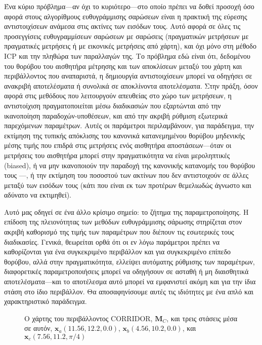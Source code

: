 Ένα κύριο πρόβλημα---αν όχι το κυριότερο---στο οποίο πρέπει να δοθεί προσοχή
όσο αφορά στους αλγορίθμους ευθυγράμμισης σαρώσεων είναι η πρακτική της εύρεσης
αντιστοιχίσεων ανάμεσα στις ακτίνες των εισόδων τους. Αυτό αφορά σε όλες τις
προσεγγίσεις ευθυγραμμίσεων σαρώσεων με σαρώσεις (πραγματικών μετρήσεων με
πραγματικές μετρήσεις ή με εικονικές μετρήσεις από χάρτη), και όχι μόνο στη
μέθοδο ICP και την πληθώρα των παραλλαγών της. Το πρόβλημα εδώ είναι ότι,
δεδομένου του θορύβου του αισθητήρα μέτρησης και των αποκλίσεων μεταξύ του
χάρτη και περιβάλλοντος που αναπαριστά, η δημιουργία αντιστοιχίσεων μπορεί να
οδηγήσει σε ανακριβή αποτελέσματα ή συνολικά σε αποκλίνοντα αποτελέσματα. Στην
πράξη, όσον αφορά στις μεθόδους που λειτουργούν απευθείας στο χώρο των
μετρήσεων, η αντιστοίχιση πραγματοποιείται μέσω διαδικασιών που εξαρτώνται από
την ικανοποίηση παραδοχών-υποθέσεων, και από την ακριβή ρύθμιση εξωτερικά
παρεχόμενων παραμέτρων. Αυτές οι παράμετροι περιλαμβάνουν, για παράδειγμα, την
εκτίμηση της τυπικής απόκλισης του κανονικά κατανεμημένου θορύβου μηδενικής
μέσης τιμής που επιδρά στις μετρήσεις ενός αισθητήρα αποστάσεων---όταν οι
μετρήσεις του αισθητήρα μπορεί στην πραγματικότητα να είναι μεροληπτικές
(biased), ή να μην ικανοποιούν την παραδοχή της κανονικής κατανομής του θορύβου
τους \cite{Cooper2018a}---, ή την εκτίμηση του ποσοστού των ακτίνων που δεν
αντιστοιχούν σε άλλες μεταξύ των εισόδων τους (κάτι που είναι εκ των προτέρων
θεμελιωδώς άγνωστο και αδύνατο να εκτιμηθεί).

Αυτό μας οδηγεί σε ένα άλλο κρίσιμο σημείο: το ζήτημα της παραμετροποίησης. Η
επίδοση της πλειονότητας των μεθόδων ευθυγράμμισης σάρωσης στηρίζεται στον
ακριβή καθορισμό της τιμής των παραμέτρων που διέπουν τις εσωτερικές τους
διαδικασίες. Γενικά, θεωρείται ορθά ότι οι εν λόγω παράμετροι πρέπει να
καθορίζονται για ένα συγκεκριμένο περιβάλλον και για συγκεκριμένο επίπεδο
θορύβου, αλλά στην πραγματικότητα, ελλείψει αυτόματης ρύθμισης των παραμέτρων,
διαφορετικές παραμετροποιήσεις μπορεί να οδηγήσουν σε ασταθή ή μη διαισθητικά
αποτελέσματα---και το αποτέλεσμα αυτό μπορεί να εμφανιστεί ακόμη και για την
ίδια στάση στο ίδιο περιβάλλον. Θα αποσαφηνίσουμε αυτές τις ιδιότητες με ένα
απλό και χαρακτηριστικό παράδειγμα.

\begin{figure}\centering
  
  \caption{\small Ο χάρτης του περιβάλλοντος CORRIDOR, $\bm{M}_C$, και τρεις
           στάσεις μέσα σε αυτόν, $\bm{x}_a(11.56, 12.2, 0.0)$,
           $\bm{x}_b(4.56, 10.2, 0.0)$, και $\bm{x}_c(7.56,11.2,\pi/4)$}
  \label{fig:02_02_05:corridor_motivation}
\end{figure}

